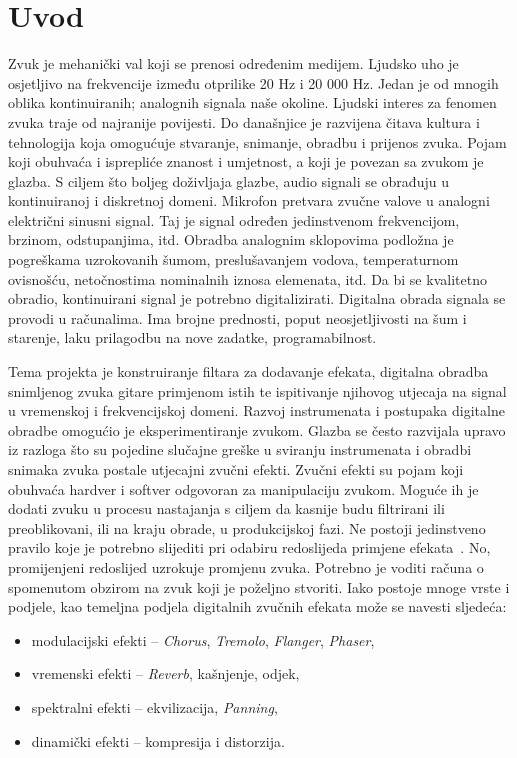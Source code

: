 \documentclass[conference]{IEEEtran}
\begin{document}
\section{Uvod}
Zvuk je mehanički val koji se prenosi određenim medijem. Ljudsko uho je osjetljivo na
frekvencije između otprilike 20 Hz i 20 000 Hz. Jedan je od mnogih oblika kontinuiranih;
analognih signala naše okoline. Ljudski interes za fenomen zvuka traje od najranije povijesti. Do
današnjice je razvijena čitava kultura i tehnologija koja omogućuje stvaranje, snimanje, obradbu
i prijenos zvuka. Pojam koji obuhvaća i isprepliće znanost i umjetnost, a koji je povezan sa zvukom
je glazba. S ciljem što boljeg doživljaja glazbe, audio signali se obrađuju u kontinuiranoj i
diskretnoj domeni. Mikrofon pretvara zvučne valove u analogni električni sinusni signal. Taj je
signal određen jedinstvenom frekvencijom, brzinom, odstupanjima, itd. Obradba analognim
sklopovima podložna je pogreškama uzrokovanih šumom, preslušavanjem vodova,
temperaturnom ovisnošću, netočnostima nominalnih iznosa elemenata, itd. Da bi se kvalitetno
obradio, kontinuirani signal je potrebno digitalizirati. Digitalna obrada signala se provodi u
računalima. Ima brojne prednosti, poput neosjetljivosti na šum i starenje, laku prilagodbu na
nove zadatke, programabilnost.

Tema projekta je konstruiranje filtara za dodavanje efekata, digitalna obradba snimljenog zvuka
gitare primjenom istih te ispitivanje njihovog utjecaja na signal u vremenskoj i frekvencijskoj
domeni. Razvoj instrumenata i postupaka digitalne obradbe omogućio je eksperimentiranje
zvukom. Glazba se često razvijala upravo iz razloga što su pojedine slučajne greške u sviranju
instrumenata i obradbi snimaka zvuka postale utjecajni zvučni efekti. Zvučni efekti su pojam koji
obuhvaća hardver i softver odgovoran za manipulaciju zvukom. Moguće ih je dodati zvuku u
procesu nastajanja s ciljem da kasnije budu filtrirani ili preoblikovani, ili
na kraju obrade, u produkcijskoj fazi. Ne postoji jedinstveno pravilo koje je potrebno slijediti pri
odabiru redoslijeda primjene efekata~\cite{b1}. No, promijenjeni redoslijed uzrokuje promjenu zvuka.
Potrebno je voditi računa o spomenutom obzirom na zvuk koji je poželjno stvoriti. Iako postoje
mnoge vrste i podjele, kao temeljna podjela digitalnih zvučnih efekata
može se navesti sljedeća:

\begin{itemize}
	\item{modulacijski efekti – \textit{Chorus}, \textit{Tremolo}, \textit{Flanger}, \textit{Phaser},}
	\item{vremenski efekti – \textit{Reverb}, kašnjenje, odjek,}
	\item{spektralni efekti – ekvilizacija, \textit{Panning},}
	\item{dinamički efekti – kompresija i distorzija.}
\end{itemize}
\end{document}
